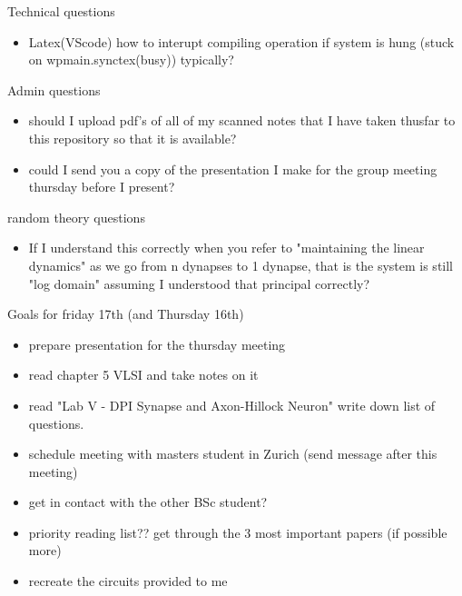 \documentclass[%
  10pt,%
]{../templates/pres_template/cognigronbeamer}
\begin{document}
\begin{frame}
  Technical questions
  \begin{itemize}
    \item Latex(VScode) how to interupt compiling operation if system is hung (stuck on wpmain.synctex(busy)) typically?
  \end{itemize}
  Admin questions
  \begin{itemize}
    \item should I upload pdf's of all of my scanned notes that I have taken thusfar to this repository so that it is available?
    \item could I send you a copy of the presentation I make for the group meeting thursday before I present?
  \end{itemize}
  random theory questions
  \begin{itemize}
    \item If I understand this correctly when you refer to "maintaining the linear dynamics" as we go from n dynapses to 1 dynapse, that is the system is still "log domain" assuming I understood that principal correctly?
  \end{itemize}
\end{frame}

\begin{frame}
  Goals for friday 17th (and Thursday 16th)
  \begin{itemize}
    \item prepare presentation for the thursday meeting
    \item read chapter 5 VLSI and take notes on it
    \item read "Lab V - DPI Synapse and Axon-Hillock Neuron" write down list of questions.
    \item schedule meeting with masters student in Zurich (send message after this meeting)
    \item get in contact with the other BSc student? 
    \item priority reading list?? get through the 3 most important papers (if possible more)
    \item recreate the circuits provided to me 
  \end{itemize}
\end{frame}

\end{document}
